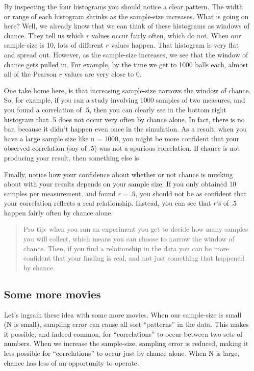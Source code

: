 \documentclass[
  letterpaper,
  DIV=11,
  numbers=noendperiod]{scrreprt}
\begin{document}
By inspecting the four histograms you should notice a clear pattern. The
width or range of each histogram shrinks as the sample-size increases.
What is going on here? Well, we already know that we can think of these
histograms as windows of chance. They tell us which \(r\) values occur
fairly often, which do not. When our sample-size is 10, lots of
different \(r\) values happen. That histogram is very flat and spread
out. However, as the sample-size increases, we see that the window of
chance gets pulled in. For example, by the time we get to 1000 balls
each, almost all of the Pearson \(r\) values are very close to 0.

One take home here, is that increasing sample-size narrows the window of
chance. So, for example, if you ran a study involving 1000 samples of
two measures, and you found a correlation of .5, then you can clearly
see in the bottom right histogram that .5 does not occur very often by
chance alone. In fact, there is no bar, because it didn't happen even
once in the simulation. As a result, when you have a large sample size
like n = 1000, you might be more confident that your observed
correlation (say of .5) was not a spurious correlation. If chance is not
producing your result, then something else is.

Finally, notice how your confidence about whether or not chance is
mucking about with your results depends on your sample size. If you only
obtained 10 samples per measurement, and found \(r = .5\), you should
not be as confident that your correlation reflects a real relationship.
Instead, you can see that \(r\)'s of .5 happen fairly often by chance
alone.

\begin{quote}
Pro tip: when you run an experiment you get to decide how many samples
you will collect, which means you can choose to narrow the window of
chance. Then, if you find a relationship in the data you can be more
confident that your finding is real, and not just something that
happened by chance.
\end{quote}

\subsection{Some more movies}\label{some-more-movies}

Let's ingrain these idea with some more movies. When our sample-size is
small (N is small), sampling error can cause all sort ``patterns'' in
the data. This makes it possible, and indeed common, for
``correlations'' to occur between two sets of numbers. When we increase
the sample-size, sampling error is reduced, making it less possible for
``correlations'' to occur just by chance alone. When N is large, chance
has less of an opportunity to operate.
\end{document}
